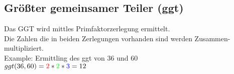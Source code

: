 \newpage
\subsection{Größter gemeinsamer Teiler (ggt)}

Das GGT wird mittles Primfaktorzerlegung ermittelt.\\
Die Zahlen die in beiden Zerlegungen vorhanden sind werden Zusammen-multipliziert.\\

\hfill \break
Example: Ermittling des ggt von 36 und 60\\
\fboxrule=0.8pt 
$ggt(36,60) = \textcolor{red}{2}*\textcolor{green}{2}*\textcolor{blue}{3} = 12$